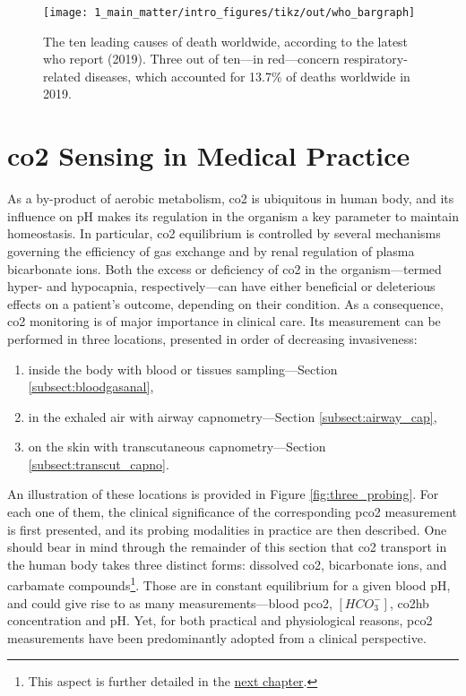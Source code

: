 \begin{figure}
	\centering
	\texttt{[image: 1\_main\_matter/intro\_figures/tikz/out/who\_bargraph]}
	\caption[The ten leading causes of death according to the WHO.]{The ten leading causes of death worldwide, according to the latest \gls{who} report (2019)\cite{who_causes_death_2019}. Three out of ten---in red---concern respiratory-related diseases, which accounted for 13.7\% of deaths worldwide in 2019.}
	\label{fig:who_causes_death}
\end{figure}



\section{\texorpdfstring{\gls{co2}}{CO2} Sensing in Medical Practice}

As a by-product of aerobic metabolism, \gls{co2} is ubiquitous in human body, and its influence on pH makes its regulation in the organism a key parameter to maintain homeostasis\cite{jones2008}. In particular, \gls{co2} equilibrium is controlled by several mechanisms governing the efficiency of gas exchange\cite{guyenet2015, nunnschap5} and by renal regulation of plasma bicarbonate ions\cite{hamm2015}. Both the excess or deficiency of \gls{co2} in the organism---termed hyper- and hypocapnia, respectively---can have either beneficial or deleterious effects on a patient's outcome, depending on their condition\cite{curley2010}. As a consequence, \gls{co2} monitoring is of major importance in clinical care. Its measurement can be performed in three locations, presented in order of decreasing invasiveness:

\begin{enumerate}
	\item	inside the body with blood or tissues sampling---Section \ref{subsect:bloodgasanal},
	\item	in the exhaled air with airway capnometry---Section \ref{subsect:airway_cap},
	\item	on the skin with transcutaneous capnometry---Section \ref{subsect:transcut_capno}.
\end{enumerate}

An illustration of these locations is provided in Figure \ref{fig:three_probing}. For each one of them, the clinical significance of the corresponding \gls{pco2} measurement is first presented, and its probing modalities in practice are then described. One should bear in mind through the remainder of this section that \gls{co2} transport in the human body takes three distinct forms: dissolved \gls{co2}, bicarbonate ions, and carbamate compounds\footnote{This aspect is further detailed in the \hyperref[chap:co2hb]{next chapter}.}. Those are in constant equilibrium for a given blood pH, and could give rise to as many measurements---blood \gls{pco2}, $[HCO_3^-]$, \gls{co2hb} concentration and pH\cite{geers2000, nunns}. Yet, for both practical and physiological reasons, \gls{pco2} measurements have been predominantly adopted from a clinical perspective.

